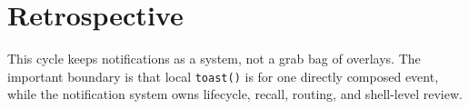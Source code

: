 \section{Retrospective}\label{record-103-retrospective}

This cycle keeps notifications as a system, not a grab bag of overlays. The important boundary is that local \texttt{t\allowbreak{}o\allowbreak{}a\allowbreak{}s\allowbreak{}t\allowbreak{}(\allowbreak{})} is for one directly composed event, while the notification system owns lifecycle, recall, routing, and shell-level review.

